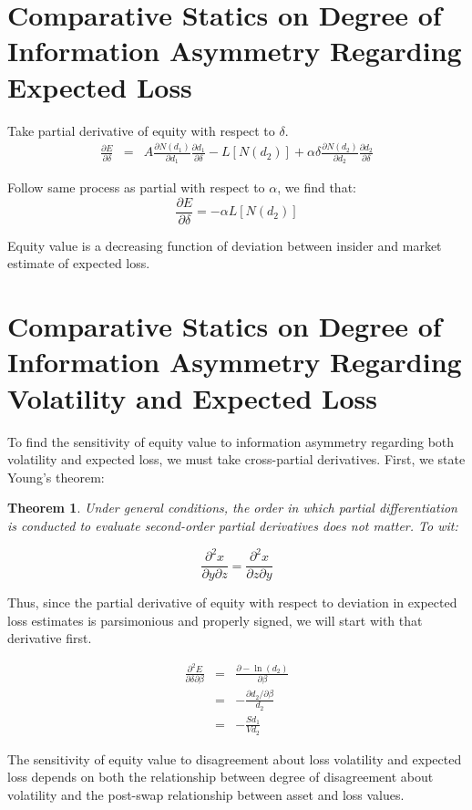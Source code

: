 \documentclass[11pt]{article}
\newtheorem{theorem}{Theorem}
\begin{document}
\section{Comparative Statics on Degree of Information Asymmetry Regarding Expected Loss}

Take partial derivative of equity with respect to $\delta$.
\begin{eqnarray}
\frac{\partial E}{\partial \delta}&=&A \frac{\partial N\left(d_1\right)}{\partial d_1}\frac{\partial d_1}{\partial \delta}-L\left[ N\left(d_2\right)\right]+\alpha \delta \frac{\partial N\left(d_2\right)}{\partial d_2}\frac{\partial d_2}{\partial \delta}
\end{eqnarray}

Follow same process as partial with respect to $\alpha$, we find that:
\begin{equation}
\frac{\partial E}{\partial \delta}=-\alpha L \left[N\left(d_2\right)\right]
\end{equation}

Equity value is a decreasing function of deviation between insider and market estimate of expected loss.

\section{Comparative Statics on Degree of Information Asymmetry Regarding Volatility and Expected Loss}

To find the sensitivity of equity value to information asymmetry regarding both volatility and expected loss, we must take cross-partial derivatives.  First, we state Young's theorem:

\begin{theorem}
Under general conditions, the order in which partial differentiation is conducted to evaluate second-order partial derivatives does not matter.  To wit:

\begin{equation}
\frac{\partial^2 x}{\partial y \partial z}=\frac{\partial^2 x}{\partial z \partial y}
\end{equation}
\end{theorem}

Thus, since the partial derivative of equity with respect to deviation in expected loss estimates is parsimonious and properly signed, we will start with that derivative first.

\begin{eqnarray}
\frac{\partial ^2 E}{\partial \delta \partial \beta}&=&\frac{\partial -\ln\left(d_2\right)}{\partial \beta} \nonumber\\
&=&-\frac{\partial d_2/\partial \beta}{d_2} \nonumber \\
&=&-\frac{Sd_1}{Vd_2}
\end{eqnarray}

The sensitivity of equity value to disagreement about loss volatility and expected loss depends on both the relationship between degree of disagreement about volatility and the post-swap relationship between asset and loss values. 
\end{document}
